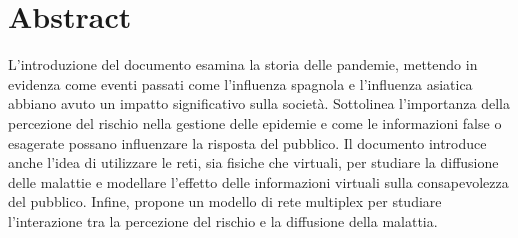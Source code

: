 \section{Abstract}\label{sec:abstract}
    L'introduzione del documento esamina la storia delle pandemie, mettendo in evidenza come eventi passati come
    l'influenza spagnola e l'influenza asiatica abbiano avuto un impatto significativo sulla società.
    Sottolinea l'importanza della percezione del rischio nella gestione delle epidemie e come le informazioni false o
    esagerate possano influenzare la risposta del pubblico.
    Il documento introduce anche l'idea di utilizzare le reti, sia fisiche che virtuali, per studiare la diffusione
    delle malattie e modellare l'effetto delle informazioni virtuali sulla consapevolezza del pubblico.
    Infine, propone un modello di rete multiplex per studiare l'interazione tra la percezione del rischio e la
    diffusione della malattia.